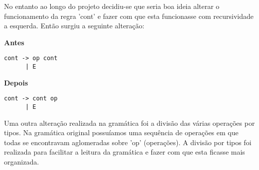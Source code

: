 \documentclass{article}
\begin{document}
No entanto ao longo do projeto decidiu-se que seria boa ideia alterar o funcionamento da regra 'cont' e fazer com que esta funcionasse com recursividade a esquerda. Então surgiu a seguinte alteração: 

\begin{minipage}[t]{0.4\textwidth}
\textbf{Antes} 
\begin{verbatim}
cont -> op cont
      | E
\end{verbatim}
\end{minipage}
\hfill
\begin{minipage}[t]{0.3\textwidth}
\textbf{Depois}
\begin{verbatim}
cont -> cont op
      | E
\end{verbatim}
\end{minipage}

Uma outra alteração realizada na gramática foi a divisão das várias operações por tipos. Na gramática original possuíamos uma sequência de operações em que todas se encontravam aglomeradas sobre 'op' (operações). A divisão por tipos foi realizada para facilitar a leitura da gramática e fazer com que esta ficasse mais organizada.
\end{document}
